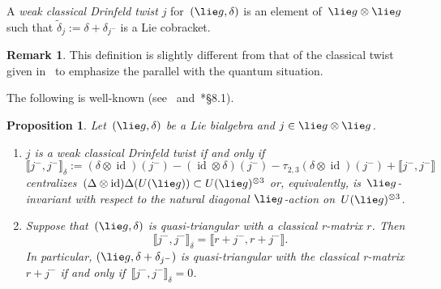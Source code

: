 \documentclass[12pt, reqno]{amsart}
\newcommand{\cybe}[1]{\mathbb{\Lbrack}#1,#1\mathbb{\Rbrack}}
\newtheorem{proposition}[theorem]{Proposition}
\theoremstyle{definition}
\newtheorem{remark}[theorem]{Remark}
\numberwithin{equation}{section}
\newcommand{\tensor}{\otimes}
\newenvironment{enumalph}{\begin{enumerate}[label={\rm(\alph*)},leftmargin=*]}{\end{enumerate}}
\DeclareMathOperator{\id}{id}
\begin{document}
A {\em weak classical Drinfeld twist} $ j $ for~$(\lie g,\delta)$ is an element 
of~$\lie g\tensor\lie g$ such that $\tilde\delta_{ j }:=\delta+
\delta_{ j ^-}$
is a Lie cobracket.  
\begin{remark}
This definition is slightly different from that of the classical twist given in~\cite{Drinf} to emphasize the parallel with the quantum situation.
\end{remark}
The following is well-known (see~\cite{Drinf} and~\cite{Majid}*{\S8.1}).
\begin{proposition}\label{prop:cnd classical twist}
Let~$(\lie g,\delta)$ be a Lie bialgebra and $ j \in \lie g\tensor\lie g$.
\begin{enumalph}
\item \label{prop:cnd classical twist.a}
$ j $ is a weak classical Drinfeld twist if and only if 
\begin{equation}
\cybe{ j ^-}_{\delta}:=(\delta\tensor\id)( j ^-)-(\id\tensor\delta)( j ^-)
-\tau_{2,3}(\delta\tensor\id)( j ^-)
+\cybe{ j ^-}\label{eq:class Drinfeld twist}
\end{equation}
centralizes~$(\Delta\tensor\id)\Delta(U(\lie g))\subset U(\lie g)^{\tensor 3}$ or, equivalently, is~$\lie g$-invariant
with respect to the natural diagonal $\lie g$-action on~$U(\lie g)^{\tensor 3}$.

\item \label{prop:cnd classical twist.b}
Suppose that~$(\lie g,\delta)$ is quasi-triangular with a classical r-matrix
$r$. Then 
\begin{equation}\cybe{ j ^-}_\delta=\cybe{r+ j ^-}.
\label{eq:class Drinfeld twist'}
\end{equation}
In particular, $(\lie g,\delta+\delta_{ j ^-})$
is quasi-triangular with the classical r-matrix~$r+ j ^-$
if and only if~$\cybe{ j ^-}_\delta=0$.
\end{enumalph}
\end{proposition}
\end{document}
